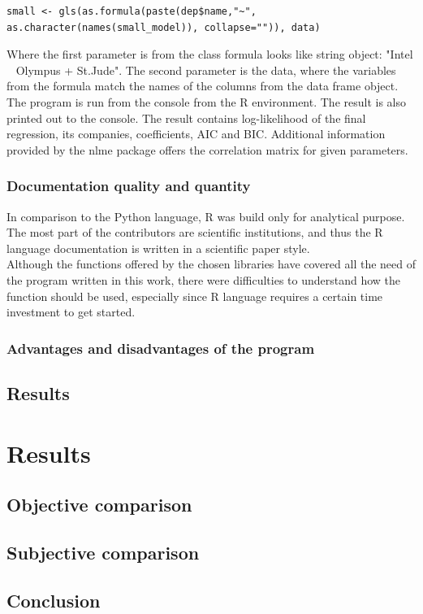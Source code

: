\documentclass{article}
\begin{document}
\begin{verbatim}
small <- gls(as.formula(paste(dep$name,"~", as.character(names(small_model)), collapse="")), data)
\end{verbatim} 
Where the first parameter is from the class formula looks like string object: "Intel ~ Olympus + St.Jude". The second parameter is the data, where the variables from the formula match the names of the columns from the data frame object.\\
The program is run from the console from the R environment. The result is also printed out to the console. The result contains log-likelihood of the final regression, its companies, coefficients, AIC and BIC. Additional information provided by the nlme package offers the correlation matrix for given parameters.  
\subsubsection{Documentation quality and quantity}
In comparison to the Python language, R was build only for analytical purpose. The most part of the contributors are scientific institutions, and thus the R language documentation is written in a scientific paper style. \\
Although the functions offered by the chosen libraries have covered all the need of the program written in this work, there were difficulties to understand how the function should be used, especially since R language requires a certain time investment to get started.
\subsubsection{Advantages and disadvantages of the program}
\subsection{Results}

\newpage
\section{Results}
\subsection{Objective comparison}
\subsection{Subjective comparison}
\subsection{Conclusion}
\end{document}
